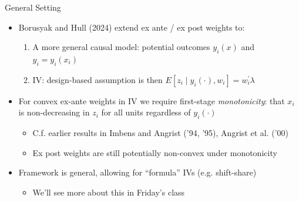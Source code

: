 \documentclass[11pt,english]{beamer}
\begin{document}
\begin{frame}{General Setting}
\begin{itemize}
\item Borusyak and Hull (2024) extend ex ante / ex post weights to:\smallskip
\begin{enumerate}
\item A more general causal model: potential outcomes $y_i(x)$ and $y_i=y_i(x_i)$\smallskip
\item IV: design-based assumption is then $E[z_i\mid y_i(\cdot),w_i]=w_i^\prime\lambda$
\end{enumerate}\bigskip\pause{}
\item For convex ex-ante weights in IV we require first-stage \emph{monotonicity}: that $x_i$ is non-decreasing in $z_i$ for all units regardless of $y_i(\cdot)$ \smallskip
\begin{itemize}
\item C.f. earlier results in Imbens and Angrist ('94, '95), Angrist et al. ('00)\smallskip\pause{}
\item Ex post weights are still potentially non-convex under monotonicity 
\end{itemize}\bigskip\pause{}
\item Framework is general, allowing for ``formula'' IVs (e.g. shift-share)\smallskip
\begin{itemize}
\item We'll see more about this in Friday's class
\end{itemize}
\end{itemize}
\end{frame}
\end{document}
